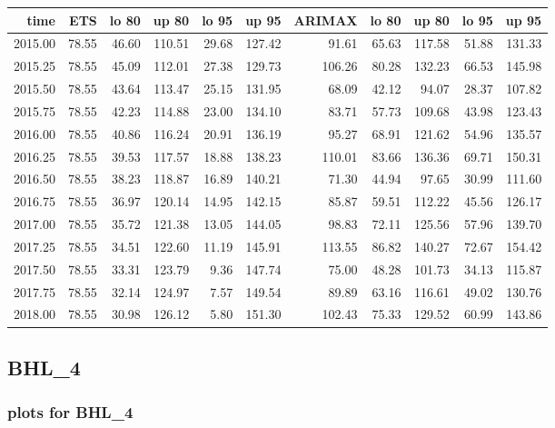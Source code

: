 \documentclass[10pt,a4paper]{article}\usepackage[]{graphicx}\usepackage[]{color}
\newcommand{\AaA}{\_}
\begin{document}
\begin{table}[ht]
\centering
\begin{tabular}{rrrrrrrrrrr}
  \hline
time & ETS  & lo 80 & up 80 & lo 95 & up 95 & ARIMAX  & lo 80 & up 80 & lo 95 & up 95 \\ 
  \hline
2015.00 & 78.55 & 46.60 & 110.51 & 29.68 & 127.42 & 91.61 & 65.63 & 117.58 & 51.88 & 131.33 \\ 
  2015.25 & 78.55 & 45.09 & 112.01 & 27.38 & 129.73 & 106.26 & 80.28 & 132.23 & 66.53 & 145.98 \\ 
  2015.50 & 78.55 & 43.64 & 113.47 & 25.15 & 131.95 & 68.09 & 42.12 & 94.07 & 28.37 & 107.82 \\ 
  2015.75 & 78.55 & 42.23 & 114.88 & 23.00 & 134.10 & 83.71 & 57.73 & 109.68 & 43.98 & 123.43 \\ 
  2016.00 & 78.55 & 40.86 & 116.24 & 20.91 & 136.19 & 95.27 & 68.91 & 121.62 & 54.96 & 135.57 \\ 
  2016.25 & 78.55 & 39.53 & 117.57 & 18.88 & 138.23 & 110.01 & 83.66 & 136.36 & 69.71 & 150.31 \\ 
  2016.50 & 78.55 & 38.23 & 118.87 & 16.89 & 140.21 & 71.30 & 44.94 & 97.65 & 30.99 & 111.60 \\ 
  2016.75 & 78.55 & 36.97 & 120.14 & 14.95 & 142.15 & 85.87 & 59.51 & 112.22 & 45.56 & 126.17 \\ 
  2017.00 & 78.55 & 35.72 & 121.38 & 13.05 & 144.05 & 98.83 & 72.11 & 125.56 & 57.96 & 139.70 \\ 
  2017.25 & 78.55 & 34.51 & 122.60 & 11.19 & 145.91 & 113.55 & 86.82 & 140.27 & 72.67 & 154.42 \\ 
  2017.50 & 78.55 & 33.31 & 123.79 & 9.36 & 147.74 & 75.00 & 48.28 & 101.73 & 34.13 & 115.87 \\ 
  2017.75 & 78.55 & 32.14 & 124.97 & 7.57 & 149.54 & 89.89 & 63.16 & 116.61 & 49.02 & 130.76 \\ 
  2018.00 & 78.55 & 30.98 & 126.12 & 5.80 & 151.30 & 102.43 & 75.33 & 129.52 & 60.99 & 143.86 \\ 
   \hline
\end{tabular}
\end{table}

\newpage
\subsection{BHL\AaA 4}
\subsubsection{plots for BHL\AaA 4}
\end{document}
